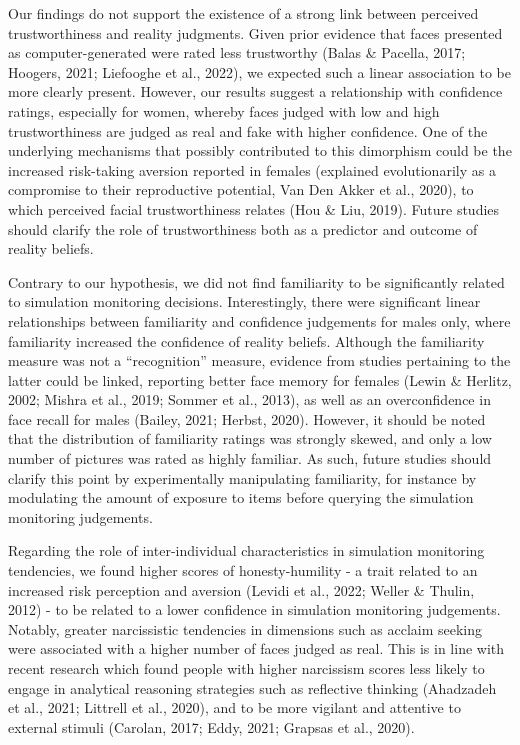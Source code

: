 \documentclass[
  man,
  floatsintext,
  longtable,
  nolmodern,
  notxfonts,
  notimes,
  colorlinks=true,linkcolor=blue,citecolor=blue,urlcolor=blue]{apa7}
\begin{document}
Our findings do not support the existence of a strong link between
perceived trustworthiness and reality judgments. Given prior evidence
that faces presented as computer-generated were rated less trustworthy
(Balas \& Pacella, 2017; Hoogers, 2021; Liefooghe et al., 2022), we
expected such a linear association to be more clearly present. However,
our results suggest a relationship with confidence ratings, especially
for women, whereby faces judged with low and high trustworthiness are
judged as real and fake with higher confidence. One of the underlying
mechanisms that possibly contributed to this dimorphism could be the
increased risk-taking aversion reported in females (explained
evolutionarily as a compromise to their reproductive potential, Van Den
Akker et al., 2020), to which perceived facial trustworthiness relates
(Hou \& Liu, 2019). Future studies should clarify the role of
trustworthiness both as a predictor and outcome of reality beliefs.

Contrary to our hypothesis, we did not find familiarity to be
significantly related to simulation monitoring decisions. Interestingly,
there were significant linear relationships between familiarity and
confidence judgements for males only, where familiarity increased the
confidence of reality beliefs. Although the familiarity measure was not
a ``recognition'' measure, evidence from studies pertaining to the
latter could be linked, reporting better face memory for females (Lewin
\& Herlitz, 2002; Mishra et al., 2019; Sommer et al., 2013), as well as
an overconfidence in face recall for males (Bailey, 2021; Herbst, 2020).
However, it should be noted that the distribution of familiarity ratings
was strongly skewed, and only a low number of pictures was rated as
highly familiar. As such, future studies should clarify this point by
experimentally manipulating familiarity, for instance by modulating the
amount of exposure to items before querying the simulation monitoring
judgements.

Regarding the role of inter-individual characteristics in simulation
monitoring tendencies, we found higher scores of honesty-humility - a
trait related to an increased risk perception and aversion (Levidi et
al., 2022; Weller \& Thulin, 2012) - to be related to a lower confidence
in simulation monitoring judgements. Notably, greater narcissistic
tendencies in dimensions such as acclaim seeking were associated with a
higher number of faces judged as real. This is in line with recent
research which found people with higher narcissism scores less likely to
engage in analytical reasoning strategies such as reflective thinking
(Ahadzadeh et al., 2021; Littrell et al., 2020), and to be more vigilant
and attentive to external stimuli (Carolan, 2017; Eddy, 2021; Grapsas et
al., 2020).
\end{document}
